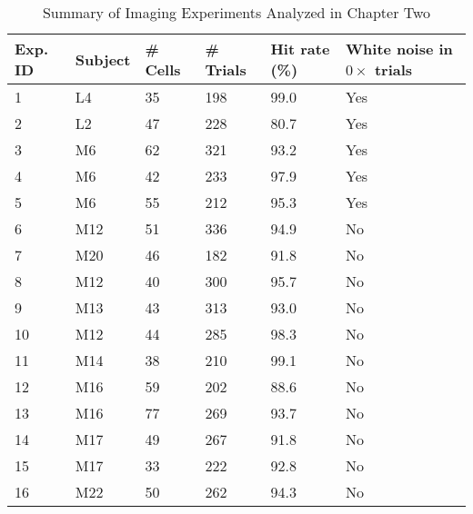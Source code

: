 
\begin{table}[htbp]
\centering
\begin{tabular}{l | l | l | l | l | l}
Exp. ID & Subject &	\# Cells &	\# Trials & Hit rate (\%) & White noise in $0\times$ trials\\
\hline
1  &	L4  & 35 & 198 &	99.0 &   Yes\\
2  &	L2  & 47 & 228 &	80.7 &   Yes\\
3  &	M6  & 62 & 321 &	93.2 &   Yes\\
4  &	M6  & 42 & 233 &	97.9 &   Yes\\
5  &	M6  & 55 & 212 &	95.3 &   Yes\\
6  &	M12 & 51 & 336 &	94.9 &   No\\	 
7  &	M20 & 46 & 182 &	91.8 &   No\\	 	 
8  &	M12 & 40 & 300 &	95.7 &   No\\	 	 
9  &	M13 & 43 & 313 &	93.0 &	 No\\	 
10 &	M12 & 44 & 285 &	98.3 &	 No\\	 
11 &	M14 & 38 & 210 &	99.1 &	 No\\	 
12 &	M16 & 59 & 202 &	88.6 &	 No\\	 
13 &	M16 & 77 & 269 &	93.7 &	 No\\	 
14 &	M17 & 49 & 267 &	91.8 &	 No\\	 
15 &	M17 & 33 & 222 &	92.8 &	 No\\	 
16 &	M22 & 50 & 262 &	94.3 &	 No\\	 
\end{tabular}
\caption{Summary of Imaging Experiments Analyzed in Chapter Two}
\label{tab:CC_table1}
\end{table}
